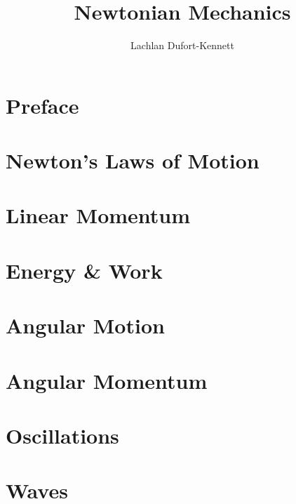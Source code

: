\documentclass{lecture-notes}
\title{Newtonian Mechanics}
\author{Lachlan Dufort-Kennett}
\begin{document}
    \frontmatter
    \maketitle
    \tableofcontents

    \chapter{Preface}

    \mainmatter
    \chapter{Newton's Laws of Motion}
    
    \chapter{Linear Momentum}
    
    \chapter{Energy \& Work}
    
    \chapter{Angular Motion}
    
    \chapter{Angular Momentum}
    
    \chapter{Oscillations}
    
    \chapter{Waves}
    

    \backmatter
    \nocite{*}
    
    
\end{document}
